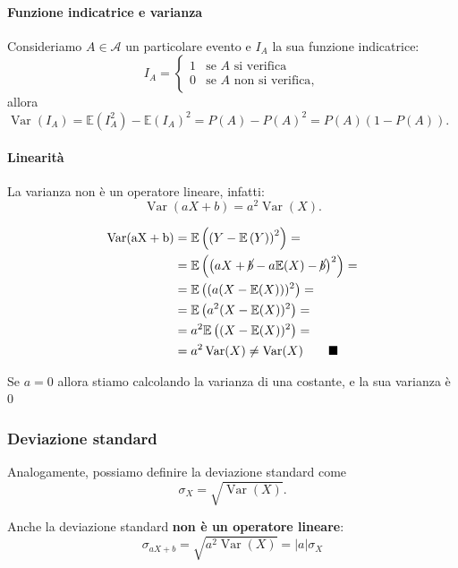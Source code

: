 \paragraph{Funzione indicatrice e varianza} 
Consideriamo $A \in \mathcal{A}$ un particolare evento e $I_A$ la sua funzione indicatrice: \[
I_A = \begin{cases}
    1 & \text{se $A$ si verifica} \\
    0 & \text{se $A$ non si verifica},
\end{cases}
\]
allora $
\operatorname{Var}(I_A) = \mathbb E \left ( I_A ^ 2 \right ) - \mathbb E \left ( I_A \right )^2 = P(A) - P(A)^2 = P(A)(1 - P(A))
$.

\paragraph{Linearità}
La varianza non è un operatore lineare, infatti: \[
\boxed{
\operatorname{Var}(aX + b) = a^2 \operatorname{Var}(X)
}.
\]

\begin{dimostrazione}
\begin{align*}
    \operatorname{Var(aX + b)} &= \mathbb{E} \left( \left( Y - \mathbb{E} \left (Y \right ) \right)^2 \right) = \\
    &= \mathbb{E} \left ( \left(a X + \cancel{b} - a \mathbb{E}(X) - \cancel b \right )^2 \right) = \\
    &= \mathbb{E} \left ( (a (X - \mathbb{E}(X)))^2 \right ) = \\
    &= \mathbb{E} \left ( a^2 (X - \mathbb{E}(X))^2 \right ) = \\
    &= a^2 \mathbb{E} \left ( (X - \mathbb{E}(X))^2 \right ) = \\
    &= a^2 \operatorname{Var}(X) \neq \operatorname{Var}(X)
    \tag*{$\blacksquare$}
\end{align*}
\end{dimostrazione}

\noindent Se $a=0$ allora stiamo calcolando la varianza di una costante, e la sua varianza è $0$

\subsubsection{Deviazione standard}
Analogamente, possiamo definire la deviazione standard come
$$
\boxed{
\sigma_X = \sqrt{\operatorname{Var}(X)}
}.
$$

\noindent Anche la deviazione standard \textbf{non è un operatore lineare}:
$$
\sigma_{aX + b} = \sqrt{a^2 \operatorname{Var}(X)} = |a| \sigma_X
$$

